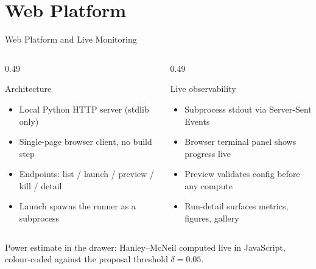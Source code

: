 \documentclass[aspectratio=169,11pt]{beamer}
\begin{document}
\section{Web Platform}
\begin{frame}{Web Platform and Live Monitoring}
\small
\begin{columns}[T]
\begin{column}{0.49\textwidth}
\begin{block}{Architecture}
\begin{itemize}
\item Local Python HTTP server (stdlib only)
\item Single-page browser client, no build step
\item Endpoints: list / launch / preview / kill / detail
\item Launch spawns the runner as a subprocess
\end{itemize}
\end{block}
\end{column}
\begin{column}{0.49\textwidth}
\begin{block}{Live observability}
\begin{itemize}
\item Subprocess stdout via Server-Sent Events
\item Browser terminal panel shows progress live
\item Preview validates config before any compute
\item Run-detail surfaces metrics, figures, gallery
\end{itemize}
\end{block}
\end{column}
\end{columns}
\vspace{0.05cm}
{\scriptsize\color{umgray}Power estimate in the drawer: Hanley--McNeil computed live in JavaScript, colour-coded against the proposal threshold $\delta\!=\!0.05$.}
\end{frame}

\end{document}
